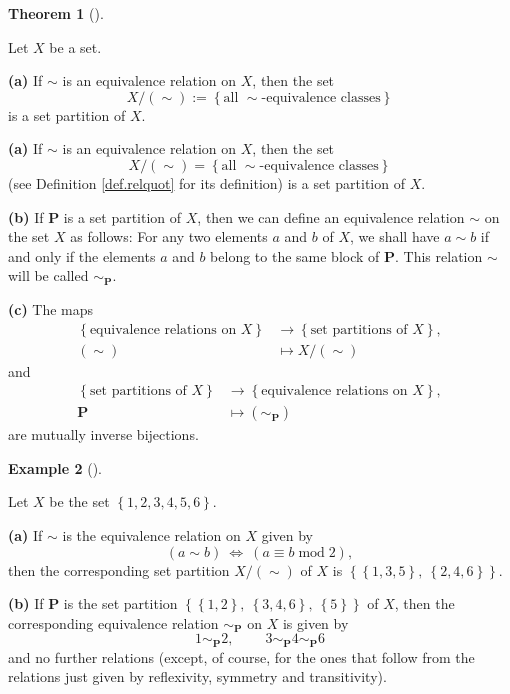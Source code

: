 \documentclass[numbers=enddot,12pt,final,onecolumn,notitlepage]{scrartcl}%
\theoremstyle{definition}
\newtheorem{theo}{Theorem}[section]
\newenvironment{theorem}[1][]
{\begin{theo}[#1]\begin{leftbar}}
{\end{leftbar}\end{theo}}
\newtheorem{exmp}[theo]{Example}
\newenvironment{example}[1][]
{\begin{exmp}[#1]\begin{leftbar}}
{\end{leftbar}\end{exmp}}
\newenvironment{verlong}{}{}
\newenvironment{vershort}{}{}
\begin{document}
\begin{theorem}
\label{thm.setpar.eqrel}Let $X$ be a set.

\begin{vershort}
\textbf{(a)} If $\sim$ is an equivalence relation on $X$, then the set%
\[
X/\left(  \sim\right)  :=\left\{  \text{all }\sim\text{-equivalence
classes}\right\}
\]
is a set partition of $X$.
\end{vershort}

\begin{verlong}
\textbf{(a)} If $\sim$ is an equivalence relation on $X$, then the set%
\[
X/\left(  \sim\right)  =\left\{  \text{all }\sim\text{-equivalence
classes}\right\}
\]
(see Definition \ref{def.relquot} for its definition) is a set partition of
$X$.
\end{verlong}

\textbf{(b)} If $\mathbf{P}$ is a set partition of $X$, then we can define an
equivalence relation $\sim$ on the set $X$ as follows: For any two elements
$a$ and $b$ of $X$, we shall have $a\sim b$ if and only if the elements $a$
and $b$ belong to the same block of $\mathbf{P}$. This relation $\sim$ will be
called $\sim_{\mathbf{P}}$.

\textbf{(c)} The maps%
\begin{align*}
\left\{  \text{equivalence relations on }X\right\}   &  \rightarrow\left\{
\text{set partitions of }X\right\}  ,\\
\left(  \sim\right)   &  \mapsto X/\left(  \sim\right)
\end{align*}
and%
\begin{align*}
\left\{  \text{set partitions of }X\right\}   &  \rightarrow\left\{
\text{equivalence relations on }X\right\}  ,\\
\mathbf{P}  &  \mapsto\left(  \sim_{\mathbf{P}}\right)
\end{align*}
are mutually inverse bijections.
\end{theorem}

\begin{example}
Let $X$ be the set $\left\{  1,2,3,4,5,6\right\}  $.

\textbf{(a)} If $\sim$ is the equivalence relation on $X$ given by
\[
\left(  a\sim b\right)  \ \Longleftrightarrow\ \left(  a\equiv
b\operatorname{mod}2\right)  ,
\]
then the corresponding set partition $X/\left(  \sim\right)  $ of $X$ is
$\left\{  \left\{  1,3,5\right\}  ,\ \left\{  2,4,6\right\}  \right\}  $.

\textbf{(b)} If $\mathbf{P}$ is the set partition $\left\{  \left\{
1,2\right\}  ,\ \left\{  3,4,6\right\}  ,\ \left\{  5\right\}  \right\}  $ of
$X$, then the corresponding equivalence relation $\sim_{\mathbf{P}}$ on $X$ is
given by%
\[
1\sim_{\mathbf{P}}2,\ \ \ \ \ \ \ \ \ \ 3\sim_{\mathbf{P}}4\sim_{\mathbf{P}}6
\]
and no further relations (except, of course, for the ones that follow from the
relations just given by reflexivity, symmetry and transitivity).
\end{example}
\end{document}
